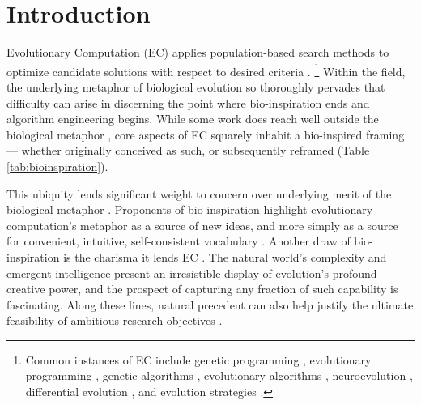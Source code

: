 \section{Introduction} \label{sec:introduction}

Evolutionary Computation (EC) applies population-based search methods to optimize candidate solutions with respect to desired criteria \citep{fogel1999evolutionary}.
\unskip\footnote{%
Common instances of EC include genetic programming \citep{koza1992genetic}, evolutionary programming \citep{fogel1966artificial}, genetic algorithms \citep{mitchell1996introduction}, evolutionary algorithms \citep{holland1975adaptation}, neuroevolution \citep{stanley2002evolving}, differential evolution \citep{storn1997differential}, and evolution strategies \citep{rechenberg1973evolutionsstrategie}.
}
Within the field, the underlying metaphor of biological evolution so thoroughly pervades that difficulty can arise in discerning the point where bio-inspiration ends and algorithm engineering begins.
While some work does reach well outside the biological metaphor \citep{hansen2001completely,munteanu1999improving,miller2015cartesian}, core aspects of EC squarely inhabit a bio-inspired framing --- whether originally conceived as such, or subsequently reframed (Table \ref{tab:bioinspiration}).



This ubiquity lends significant weight to concern over underlying merit of the biological metaphor \citep{moore2023evolution}.
Proponents of bio-inspiration highlight evolutionary computation's metaphor as a source of new ideas, and more simply as a source for convenient, intuitive, self-consistent vocabulary \citep{sorensen2013metaheuristics,banzhaf2006artificial}.
Another draw of bio-inspiration is the charisma it lends EC \citep{lehman2020surprising}.
The natural world's complexity and emergent intelligence present an irresistible display of evolution's profound creative power, and the prospect of capturing any fraction of such capability is fascinating.
Along these lines, natural precedent can also help justify the ultimate feasibility of ambitious research objectives \citep{miikkulainen2021biological,banzhaf2006artificial}.

